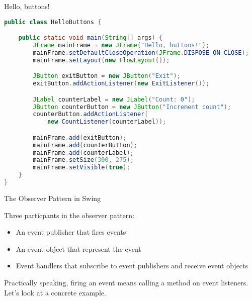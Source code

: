 \documentclass{beamer}
\begin{document}
\begin{frame}[fragile]{Hello, buttons!}


\begin{lstlisting}[language=Java]
public class HelloButtons {

    public static void main(String[] args) {
        JFrame mainFrame = new JFrame("Hello, buttons!");
        mainFrame.setDefaultCloseOperation(JFrame.DISPOSE_ON_CLOSE);
        mainFrame.setLayout(new FlowLayout());

        JButton exitButton = new JButton("Exit");
        exitButton.addActionListener(new ExitListener());

        JLabel counterLabel = new JLabel("Count: 0");
        JButton counterButton = new JButton("Increment count");
        counterButton.addActionListener(
            new CountListener(counterLabel));

        mainFrame.add(exitButton);
        mainFrame.add(counterButton);
        mainFrame.add(counterLabel);
        mainFrame.setSize(300, 275);
        mainFrame.setVisible(true);
    }
}
\end{lstlisting}


\end{frame}

\begin{frame}[fragile]{The Observer Pattern in Swing}


Three particpants in the observer pattern:
\begin{itemize}
\item An event publisher that fires events
\item An event object that represent the event
\item Event handlers that subscribe to event publishers and receive event objects
\end{itemize}

Practically speaking, firing an event means calling a method on event listeners.  Let's look at a concrete example.




\end{frame}
\end{document}
